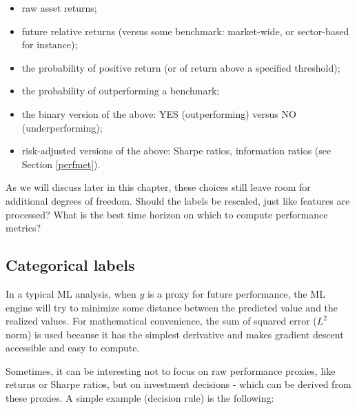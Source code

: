 \documentclass[]{krantz}
\providecommand{\tightlist}{%
  \setlength{\itemsep}{0pt}\setlength{\parskip}{0pt}}
\theoremstyle{definition}
\theoremstyle{definition}
\theoremstyle{definition}
\theoremstyle{remark}
\begin{document}
\begin{itemize}
\tightlist
\item
  raw asset returns;\\
\item
  future relative returns (versus some benchmark: market-wide, or
  sector-based for instance);\\
\item
  the probability of positive return (or of return above a specified
  threshold);\\
\item
  the probability of outperforming a benchmark;\\
\item
  the binary version of the above: YES (outperforming) versus NO
  (underperforming);\\
\item
  risk-adjusted versions of the above: Sharpe ratios, information ratios
  (see Section \ref{perfmet}).
\end{itemize}

As we will discuss later in this chapter, these choices still leave room
for additional degrees of freedom. Should the labels be rescaled, just
like features are processed? What is the best time horizon on which to
compute performance metrics?

\hypertarget{categorical-labels}{%
\subsection{Categorical labels}\label{categorical-labels}}

In a typical ML analysis, when \(y\) is a proxy for future performance,
the ML engine will try to minimize some distance between the predicted
value and the realized values. For mathematical convenience, the sum of
squared error (\(L^2\) norm) is used because it has the simplest
derivative and makes gradient descent accessible and easy to compute.

Sometimes, it can be interesting not to focus on raw performance
proxies, like returns or Sharpe ratios, but on investment decisions -
which can be derived from these proxies. A simple example (decision
rule) is the following:
\end{document}
